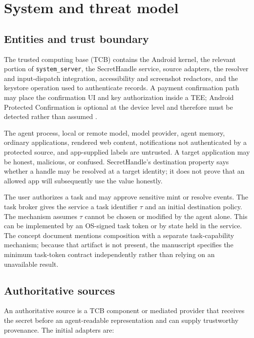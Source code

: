 \section{System and threat model}
\label{sec:system}

\subsection{Entities and trust boundary}



The trusted computing base (TCB) contains the Android kernel, the relevant portion of \texttt{system\_server}, the SecretHandle service, source adapters, the resolver and input-dispatch integration, accessibility and screenshot redactors, and the keystore operation used to authenticate records. A payment confirmation path may place the confirmation UI and key authorization inside a TEE; Android Protected Confirmation is optional at the device level and therefore must be detected rather than assumed \cite{androidProtectedConfirmation}.

The agent process, local or remote model, model provider, agent memory, ordinary applications, rendered web content, notifications not authenticated by a protected source, and app-supplied labels are untrusted. A target application may be honest, malicious, or confused. SecretHandle's destination property says whether a handle may be resolved at a target identity; it does not prove that an allowed app will subsequently use the value honestly.

The user authorizes a task and may approve sensitive mint or resolve events. The task broker gives the service a task identifier $\tau$ and an initial destination policy. The mechanism assumes $\tau$ cannot be chosen or modified by the agent alone. This can be implemented by an OS-signed task token or by state held in the service. The concept document mentions composition with a separate task-capability mechanism; because that artifact is not present, the manuscript specifies the minimum task-token contract independently rather than relying on an unavailable result.

\subsection{Authoritative sources}

An authoritative source is a TCB component or mediated provider that receives the secret before an agent-readable representation and can supply trustworthy provenance. The initial adapters are:

